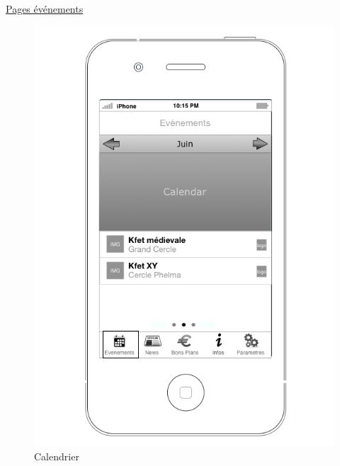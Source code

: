 \documentclass[a4paper, 11pt]{article}
\begin{document}
\underline{Pages événements}
\begin{figure}[htbp]
	\begin{minipage}[c]{.33\linewidth}
		\begin{center}
			\includegraphics[scale=0.28]{../../Sketch/iOS/evenements_calendar.png}
		\end{center}
	\caption{Calendrier}
	\label{calendar}


\end{minipage}
\end{figure}
\end{document}
